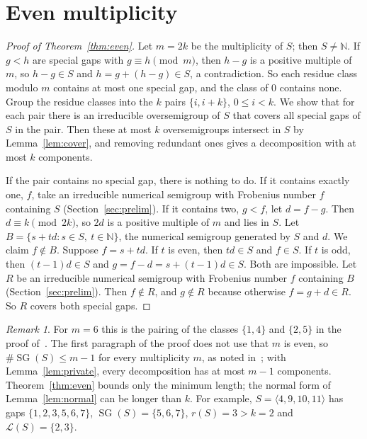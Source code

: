 \documentclass[11pt]{article}
\theoremstyle{definition}
\theoremstyle{remark}
\newtheorem{remark}{Remark}
\newcommand{\N}{\mathbb N}
\DeclareMathOperator{\SG}{SG}
\begin{document}
\section{Even multiplicity}\label{sec:even}

\begin{proof}[Proof of Theorem~\ref{thm:even}]
Let $m=2k$ be the multiplicity of $S$; then $S\ne\N$. If $g<h$ are special
gaps with $g\equiv h\pmod m$, then $h-g$ is a positive multiple of $m$, so
$h-g\in S$ and $h=g+(h-g)\in S$, a contradiction. So each residue class
modulo $m$ contains at most one special gap, and the class of $0$ contains
none. Group the residue classes into the $k$ pairs $\{i,i+k\}$,
$0\le i<k$. We show that for each pair there is an irreducible oversemigroup
of $S$ that covers all special gaps of $S$ in the pair. Then these at most
$k$ oversemigroups intersect in $S$ by Lemma~\ref{lem:cover}, and removing
redundant ones gives a decomposition with at most $k$ components.

If the pair contains no special gap, there is nothing to do. If it contains
exactly one, $f$, take an irreducible numerical semigroup with Frobenius
number $f$ containing $S$ (Section~\ref{sec:prelim}). If it contains two,
$g<f$, let $d=f-g$. Then $d\equiv k\pmod{2k}$, so $2d$ is a positive multiple
of $m$ and lies in $S$. Let $B=\{s+td:s\in S,\ t\in\N\}$, the numerical
semigroup generated by $S$ and $d$. We claim $f\notin B$. Suppose $f=s+td$.
If $t$ is even, then $td\in S$ and $f\in S$. If $t$ is odd, then
$(t-1)d\in S$ and $g=f-d=s+(t-1)d\in S$. Both are impossible. Let $R$ be an
irreducible numerical semigroup with Frobenius number $f$ containing $B$
(Section~\ref{sec:prelim}). Then $f\notin R$, and $g\notin R$ because
otherwise $f=g+d\in R$. So $R$ covers both special gaps.
\end{proof}

\begin{remark}
For $m=6$ this is the pairing of the classes $\{1,4\}$ and $\{2,5\}$ in the
proof of~\cite[Theorem~3.5]{go}. The first paragraph of the proof does not use
that $m$ is even, so $\#\SG(S)\le m-1$ for every multiplicity $m$, as noted
in~\cite[Section~2]{go}; with Lemma~\ref{lem:private}, every decomposition has
at most $m-1$ components. Theorem~\ref{thm:even} bounds only the minimum
length; the normal form of Lemma~\ref{lem:normal} can be longer than $k$. For
example, $S=\langle 4,9,10,11\rangle$ has gaps $\{1,2,3,5,6,7\}$,
$\SG(S)=\{5,6,7\}$, $r(S)=3>k=2$ and $\mathcal L(S)=\{2,3\}$.
\end{remark}
\end{document}
